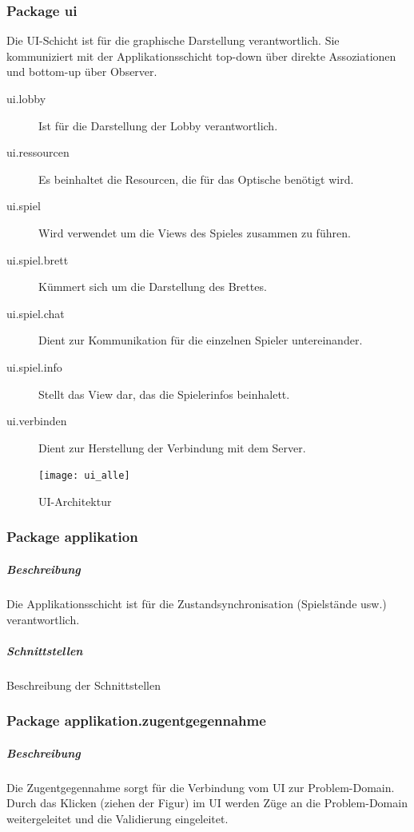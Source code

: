 \documentclass[12pt,halfparskip]{scrartcl}
\begin{document}
\clearpage
\subsubsection{Package ui} %
\label{ssub:package_ui}
Die UI-Schicht ist für die graphische Darstellung verantwortlich. Sie kommuniziert mit der Applikationsschicht top-down über direkte Assoziationen und bottom-up über Observer.

\begin{description}
	\item[ui.lobby] Ist für die Darstellung der Lobby verantwortlich.
	\item[ui.ressourcen] Es beinhaltet die Resourcen, die für das Optische benötigt wird.
	\item[ui.spiel] Wird verwendet um die Views des Spieles zusammen zu führen.
	\item[ui.spiel.brett] Kümmert sich um die Darstellung des Brettes.
	\item[ui.spiel.chat] Dient zur Kommunikation für die einzelnen Spieler untereinander.
	\item[ui.spiel.info] Stellt das View dar, das die Spielerinfos beinhalett.
	\item[ui.verbinden] Dient zur Herstellung der Verbindung mit dem Server.
\end{description}

\begin{figure}[h]
	\centering
	\texttt{[image: ui\_alle]}
	\caption{UI-Architektur}
	\label{fig:ui_alle}
\end{figure}

\clearpage
\subsubsection{Package applikation} %
\label{ssub:package_applikation}
\subparagraph{Beschreibung}
Die Applikationsschicht ist für die Zustandsynchronisation (Spielstände usw.) verantwortlich. 

\subparagraph{Schnittstellen} %
\label{ssub:schnittstellen}
Beschreibung der Schnittstellen

\clearpage
\subsubsection{Package applikation.zugentgegennahme} %
\label{ssub:package_applikation_zugentgegennahme}
\subparagraph{Beschreibung}
Die Zugentgegennahme sorgt für die Verbindung vom UI zur Problem-Domain. Durch das Klicken (ziehen der Figur) im UI werden Züge an die Problem-Domain weitergeleitet und die Validierung eingeleitet.
\end{document}
